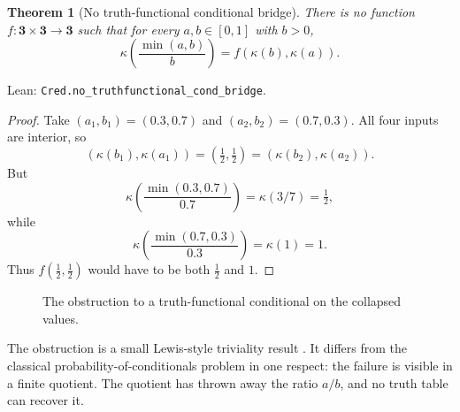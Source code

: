 \documentclass[11pt,a4paper]{article}
\newtheorem{theorem}{Theorem}[section]
\newcommand{\collapse}{\kappa}
\newcommand{\half}{\tfrac12}
\newcommand{\three}{\mathbf{3}}
\newcommand{\Lean}[1]{\texttt{#1}}
\begin{document}
\begin{theorem}[No truth-functional conditional bridge]
\label{thm:no-cond-bridge}
There is no function
$f:\three\times\three\to\three$ such that for every $a,b\in[0,1]$
with $b>0$,
\[
  \collapse\!\left(\frac{\min(a,b)}{b}\right)
  =f(\collapse(b),\collapse(a)).
\]
\end{theorem}

\noindent
Lean: \Lean{Cred.no\_truthfunctional\_cond\_bridge}.

\begin{proof}
Take $(a_1,b_1)=(0.3,0.7)$ and $(a_2,b_2)=(0.7,0.3)$.
All four inputs are interior, so
\[
  (\collapse(b_1),\collapse(a_1))
  =(\half,\half)
  =(\collapse(b_2),\collapse(a_2)).
\]
But
\[
  \collapse\!\left(\frac{\min(0.3,0.7)}{0.7}\right)
  =\collapse(3/7)=\half,
\]
while
\[
  \collapse\!\left(\frac{\min(0.7,0.3)}{0.3}\right)
  =\collapse(1)=1.
\]
Thus $f(\half,\half)$ would have to be both $\half$ and $1$.
\end{proof}

\begin{figure}[h]
\centering
{}
\caption{The obstruction to a truth-functional conditional on the
collapsed values.}
\label{fig:no-conditional}
\end{figure}

The obstruction is a small Lewis-style triviality result
\cite{lewis1976,vanfraassen1976,adams1975,mcgee1985}.  It differs
from the classical probability-of-conditionals problem in one respect:
the failure is visible in a finite quotient.  The quotient has thrown
away the ratio $a/b$, and no truth table can recover it.
\end{document}
